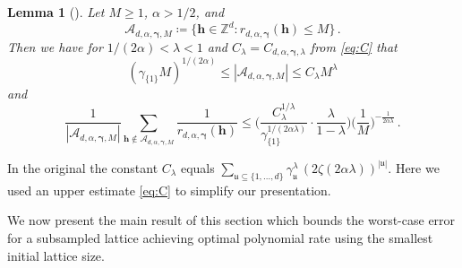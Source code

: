 \documentclass[a4paper]{amsart}
\newtheorem{lemma}[theorem]{Lemma}
\begin{document}
\begin{lemma}[{\cite[Lemmata~5.2 and 5.3]{KMN24}}]\label{muzofm} Let $M\ge 1$, $\alpha>1/2$, and
    \begin{equation*}
        \mathcal A_{d,\alpha,\bm\gamma,M}
        \coloneqq \Big\{\bm h\in\mathds Z^d : r_{d,\alpha,\bm\gamma}(\bm h) \le M \Big\} \,.
    \end{equation*}
    Then we have for $1/(2\alpha) < \lambda < 1$
    and $C_\lambda=C_{d,\alpha,\bm\gamma,\lambda}$ from \eqref{eq:C} that
    \begin{equation*}
        (\gamma_{\{1\}} M)^{1/(2\alpha)}
        \le |\mathcal A_{d,\alpha,\bm\gamma,M}|
        \le C_\lambda M^{\lambda}
    \end{equation*}
    and
\begin{equation*}
        \frac{1}{|\mathcal A_{d,\alpha,\bm\gamma,M}|} \sum_{\bm h\notin \mathcal A_{d,\alpha,\bm\gamma,M}} \frac{1}{r_{d,\alpha,\bm\gamma}(\bm h)}
        \le
        \Big(
        \frac{ C_\lambda^{1/\lambda} }{ \gamma_{\{1\}}^{1/(2\alpha\lambda)} }
        \cdot
        \frac{\lambda }{1-\lambda}
        \Big)
        \Big(\frac 1M\Big)^{-\frac{1}{2\alpha\lambda}} \,.
    \end{equation*}
\end{lemma} 

In the original \cite[Lemma~5.2]{KMN24} the constant $C_\lambda$ equals $\sum_{\mathfrak u\subseteq\{1,\dots,d\}} \gamma_{\mathfrak u}^{\lambda} \, (2\zeta(2\alpha\lambda))^{|\mathfrak u|}$.
Here we used an upper estimate \eqref{eq:C} to simplify our presentation.



We now present the main result of this section which bounds the worst-case error for a subsampled lattice achieving optimal polynomial rate using the smallest initial lattice size.
\end{document}
